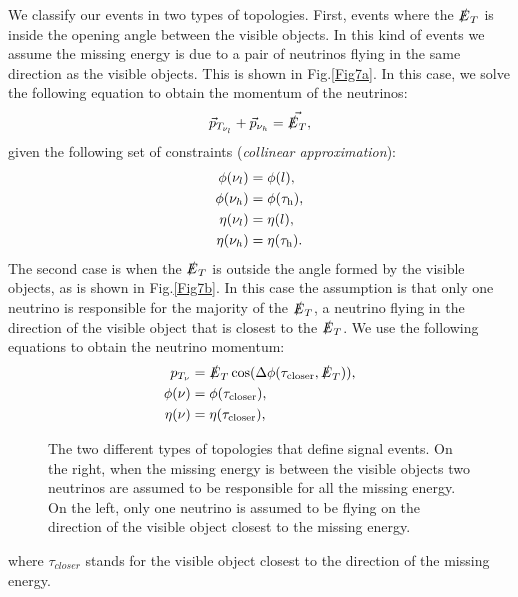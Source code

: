We classify our events in two types of topologies. First, events where the $\slashed{E}_T$ is inside the opening angle between the visible objects. In this kind of events we assume the missing energy is due to a pair of neutrinos flying in the same direction as the visible objects. This is shown in Fig.\ref{Fig7a}. In this case, we solve the following equation to obtain the momentum of the neutrinos:
\begin{equation}
	\vec{p}_{T_{\nu_l}}+\vec{p}_{\nu_h}=\vec{\slashed{E}_T},
\end{equation}
given the following set of constraints (\textit{collinear approximation}):
\begin{align}
	\phi(\nu_l)&=\phi(l),
	\\
	\phi(\nu_h)&=\phi(\tau_\text{h}),
	\\
	\eta(\nu_l)&=\eta(l),
	\\
	\eta(\nu_h)&=\eta(\tau_\text{h}).
\end{align}
The second case is when the $\slashed{E}_T$ is outside the angle formed by the visible objects, as is shown in Fig.\ref{Fig7b}. In this case the assumption is that only one neutrino is responsible for the majority of the $\slashed{E}_T$, a neutrino flying in the direction of the visible object that is closest to the $\slashed{E}_T$. We use the following equations to obtain the neutrino momentum:
\begin{align}
p_{T_{\nu}}&=\slashed{E}_T \cos(\Delta\phi(\tau_{\text{closer}},\slashed{E}_T)),
\\
\phi(\nu)&=\phi(\tau_{\text{closer}}),
\\
\eta(\nu)&=\eta(\tau_{\text{closer}}),
\end{align} 
\begin{figure}[ht]
	\centering
	\hfill
	\caption{The two different types of topologies that define signal events. On the right, when the missing energy is between the visible objects two neutrinos are assumed to be responsible for all the missing energy. On the left, only one neutrino is assumed to be flying on the direction of the visible object closest to the missing energy.}
	\label{Fig7}
\end{figure}
where $\tau_{closer}$ stands for the visible object closest to the direction of the missing energy.

